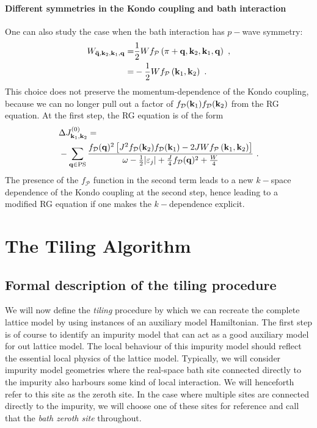 \documentclass[reprint,hidelinks]{revtex4-2}
\begin{document}
\paragraph{Different symmetries in the Kondo coupling and bath interaction}
One can also study the case when the bath interaction has \(p-\)wave symmetry:
\begin{equation}\begin{aligned}
	W_{{\bf \bar q}, {\bf k}_2, {\bf k}_1, {\bf q}} =& \frac{1}{2}W f_\mathcal{P}\left(\pi + {\bf q}, {\bf k}_2, {\bf k}_1, {\bf q}\right) ~,\\
	=& -\frac{1}{2}Wf_\mathcal{P}\left({\bf k}_1, {\bf k}_2\right)~.
\end{aligned}\end{equation}
This choice does not preserve the momentum-dependence of the Kondo coupling, because we can no longer pull out a factor of \(f_\mathcal{D}({\bf k}_1)f_\mathcal{D}({\bf k}_2)\) from the RG equation. At the first step, the RG equation is of the form
\begin{equation}\begin{aligned}
	&\Delta J^{(0)}_{{\bf k}_1, {\bf k}_2} =\\
	&-\sum_{{\bf q} \in \text{PS}} \frac{f_\mathcal{D}({\bf q})^2\left[{J}^2 f_\mathcal{D}({\bf k}_2)f_\mathcal{D}({\bf k}_1) - 2JW f_\mathcal{P}\left({\bf k}_1, {\bf k}_2\right)\right] }{\omega - \frac{1}{2}|\varepsilon_j| + \frac{J}{4}f_\mathcal{D}({\bf q})^2 + \frac{W}{4}}~.
\end{aligned}\end{equation}
The presence of the \(f_\mathcal{P}\) function in the second term leads to a new \(k-\)space dependence of the Kondo coupling at the second step, hence leading to a modified RG equation if one makes the \(k-\)dependence explicit.

\section{The Tiling Algorithm}

\subsection{Formal description of the tiling procedure}\label{formalDescription}
We will now define the {\it tiling} procedure by which we can recreate the complete lattice model by using instances of an auxiliary model Hamiltonian. The first step is of course to identify an impurity model that can act as a good auxiliary model for out lattice model. The local behaviour of this impurity model should reflect the essential local physics of the lattice model. Typically, we will consider impurity model geometries where the real-space bath site connected directly to the impurity also harbours some kind of local interaction. We will henceforth refer to this site as the zeroth site. In the case where multiple sites are connected directly to the impurity, we will choose one of these sites for reference and call that the {\it bath zeroth site} throughout.
\end{document}
